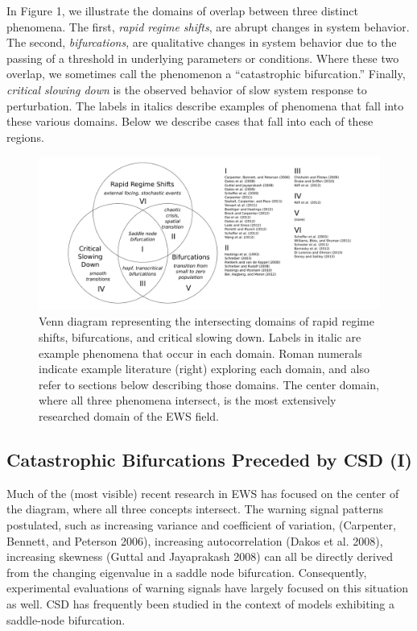 \documentclass[author-year, review]{elsarticle} %
\makeatletter
\def\maxwidth{\ifdim\Gin@nat@width>\linewidth\linewidth
\else\Gin@nat@width\fi}
\let\Oldincludegraphics\includegraphics
\renewcommand{\includegraphics}[1]{\Oldincludegraphics[width=\maxwidth]{#1}}
\makeatother
\begin{document}
In Figure 1, we illustrate the domains of overlap between three distinct
phenomena. The first, \emph{rapid regime shifts}, are abrupt changes in
system behavior. The second, \emph{bifurcations}, are qualitative
changes in system behavior due to the passing of a threshold in
underlying parameters or conditions. Where these two overlap, we
sometimes call the phenomenon a ``catastrophic bifurcation.'' Finally,
\emph{critical slowing down} is the observed behavior of slow system
response to perturbation. The labels in italics describe examples of
phenomena that fall into these various domains. Below we describe cases
that fall into each of these regions.

\begin{figure}[htbp]
\centering
\includegraphics{ews-venn.pdf}
\caption{Venn diagram representing the intersecting domains of rapid
regime shifts, bifurcations, and critical slowing down. Labels in italic
are example phenomena that occur in each domain. Roman numerals indicate
example literature (right) exploring each domain, and also refer to
sections below describing those domains. The center domain, where all
three phenomena intersect, is the most extensively researched domain of
the EWS field.}
\end{figure}

\subsection{Catastrophic Bifurcations Preceded by CSD (I)}

Much of the (most visible) recent research in EWS has focused on the
center of the diagram, where all three concepts intersect. The warning
signal patterns postulated, such as increasing variance and coefficient
of variation, (Carpenter, Bennett, and Peterson 2006), increasing
autocorrelation (Dakos et al. 2008), increasing skewness (Guttal and
Jayaprakash 2008) can all be directly derived from the changing
eigenvalue in a saddle node bifurcation. Consequently, experimental
evaluations of warning signals have largely focused on this situation as
well. CSD has frequently been studied in the context of models
exhibiting a saddle-node bifurcation.
\end{document}
